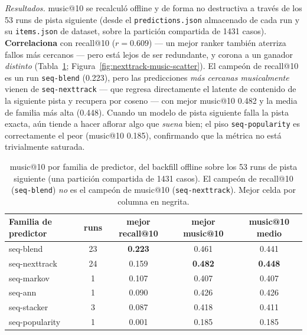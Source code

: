 \documentclass[11pt]{article}
\newcommand{\best}[1]{\textbf{#1}}
\begin{document}
\emph{Resultados.} music@10 se recalculó offline y de forma no destructiva a través
de los 53 runs de pista siguiente (desde el \texttt{predictions.json} almacenado de
cada run y su \texttt{items.json} de dataset, sobre la partición compartida de
\num{1431} casos). \textbf{Correlaciona} con recall@10 ($r = \num{0.609}$) --- un
mejor ranker también aterriza fallos más cercanos --- pero está lejos de ser
redundante, y corona a un ganador \emph{distinto} (Tabla~\ref{tab:music-families};
Figura~\ref{fig:nexttrack-music-scatter}). El campeón de recall@10 es un run
\texttt{seq-blend} (\num{0.223}), pero las predicciones \emph{más cercanas
musicalmente} vienen de \texttt{seq-nexttrack} --- que regresa directamente el latente
de contenido de la siguiente pista y recupera por coseno --- con mejor music@10
\num{0.482} y la media de familia más alta (\num{0.448}). Cuando un modelo de pista
siguiente falla la pista exacta, aún tiende a hacer aflorar algo que \emph{suena}
bien; el piso \texttt{seq-popularity} es correctamente el peor (music@10 \num{0.185}),
confirmando que la métrica no está trivialmente saturada.

\begin{table}[ht]
  \centering
  \caption{music@10 por familia de predictor, del backfill offline sobre los 53 runs
  de pista siguiente (una partición compartida de \num{1431} casos). El campeón de
  recall@10 (\texttt{seq-blend}) \emph{no} es el campeón de music@10
  (\texttt{seq-nexttrack}). Mejor celda por columna en negrita.}
  \label{tab:music-families}
  {\footnotesize\setlength{\tabcolsep}{6pt}\begin{tabular}{lcccc}
    \toprule
    Familia de predictor & runs & mejor recall@10 & mejor music@10 & music@10 medio \\
    \midrule
    seq-blend      & 23 & \best{0.223} & 0.461 & 0.441 \\
    seq-nexttrack  & 24 & 0.159 & \best{0.482} & \best{0.448} \\
    seq-markov     & 1  & 0.107 & 0.407 & 0.407 \\
    seq-ann        & 1  & 0.090 & 0.426 & 0.426 \\
    seq-stacker    & 3  & 0.087 & 0.418 & 0.411 \\
    seq-popularity & 1  & 0.001 & 0.185 & 0.185 \\
    \bottomrule
  \end{tabular}}
\end{table}
\end{document}
